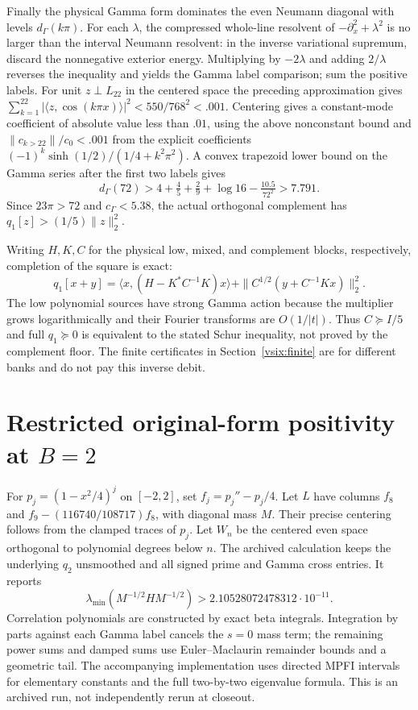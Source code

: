 \documentclass[11pt,a4paper]{article}
\numberwithin{equation}{section}
\theoremstyle{definition}\newtheorem{definition}[theorem]{Definition}
\theoremstyle{remark}\newtheorem{remark}[theorem]{Remark}
\newcommand{\ip}[2]{\langle#1,#2\rangle}\newcommand{\norm}[1]{\lVert#1\rVert}\newcommand{\abs}[1]{\lvert#1\rvert}
\begin{document}
Finally the physical Gamma form dominates the even Neumann diagonal with levels $d_\Gamma(k\pi)$. For each $\lambda$, the compressed whole-line resolvent of $-\partial_x^2+\lambda^2$ is no larger than the interval Neumann resolvent: in the inverse variational supremum, discard the nonnegative exterior energy. Multiplying by $-2\lambda$ and adding $2/\lambda$ reverses the inequality and yields the Gamma label comparison; sum the positive labels. For unit $z\perp L_{22}$ in the centered space the preceding approximation gives $\sum_{k=1}^{22}|\ip{z}{\cos(k\pi x)}|^2<550/768^2<.001$. Centering gives a constant-mode coefficient of absolute value less than $.01$, using the above nonconstant bound and $\|c_{k>22}\|/c_0<.001$ from the explicit coefficients $(-1)^k\sinh(1/2)/(1/4+k^2\pi^2)$. A convex trapezoid lower bound on the Gamma series after the first two labels gives
\[
 d_\Gamma(72)>4+\tfrac45+\tfrac29+\log16-\tfrac{10.5}{72^2}>7.791.
\]
Since $23\pi>72$ and $c_\Gamma<5.38$, the actual orthogonal complement has $q_1[z]>(1/5)\|z\|_2^2$.

Writing $H,K,C$ for the physical low, mixed, and complement blocks, respectively, completion of the square is exact:
\[
 q_1[x+y]=\ip{x}{(H-K^*C^{-1}K)x}
       +\|C^{1/2}(y+C^{-1}Kx)\|_2^2.
\]
The low polynomial sources have strong Gamma action because the multiplier grows logarithmically and their Fourier transforms are $O(1/|t|)$. Thus $C\succeq I/5$ and full $q_1\succeq0$ is equivalent to the stated Schur inequality, not proved by the complement floor. The finite certificates in Section~\ref{vsix:finite} are for different banks and do not pay this inverse debit.

\section[Restricted original form at B=2]{Restricted original-form positivity at $B=2$}
For $p_j=(1-x^2/4)^j$ on $[-2,2]$, set $f_j=p_j''-p_j/4$. Let $L$ have columns $f_8$ and $f_9-(116740/108717)f_8$, with diagonal mass $M$. Their precise centering follows from the clamped traces of $p_j$. Let $W_n$ be the centered even space orthogonal to polynomial degrees below $n$. The archived calculation keeps the underlying $q_2$ unsmoothed and all signed prime and Gamma cross entries. It reports
\[
 \lambda_{\min}(M^{-1/2}H M^{-1/2})>2.10528072478312\cdot10^{-11}.
\]
Correlation polynomials are constructed by exact beta integrals. Integration by parts against each Gamma label cancels the $s=0$ mass term; the remaining power sums and damped sums use Euler--Maclaurin remainder bounds \cite{vsixDLMFSum} and a geometric tail. The accompanying implementation uses directed MPFI intervals for elementary constants and the full two-by-two eigenvalue formula. This is an archived run, not independently rerun at closeout.
\end{document}

